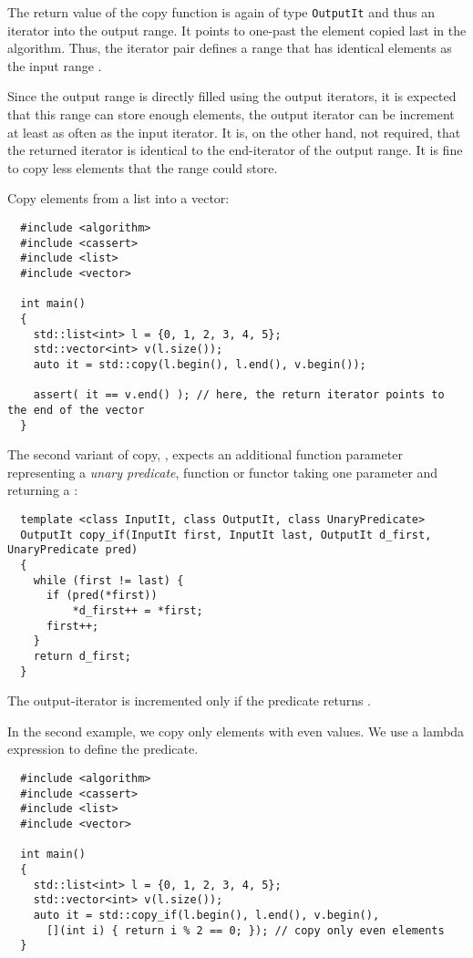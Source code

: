 The return value of the copy function is again of type \texttt{OutputIt} and thus an iterator into the output range. It points to one-past the element
copied last in the algorithm. Thus, the iterator pair \cpp{[d_first, return_value)} defines a range that has identical elements as the
input range \cpp{[first, last)}.

Since the output range is directly filled using the output iterators, it is expected that this range can store enough elements, \ie the output iterator
can be increment at least as often as the input iterator. It is, on the other hand, not required, that the returned iterator is identical to the end-iterator
of the output range. It is fine to copy less elements that the range could store.

\begin{example}
  Copy elements from a list into a vector:
  \begin{verbatim}
  #include <algorithm>
  #include <cassert>
  #include <list>
  #include <vector>

  int main()
  {
    std::list<int> l = {0, 1, 2, 3, 4, 5};
    std::vector<int> v(l.size());
    auto it = std::copy(l.begin(), l.end(), v.begin());

    assert( it == v.end() ); // here, the return iterator points to the end of the vector
  }
  \end{verbatim}
\end{example}

The second variant of copy, , expects an additional function parameter representing a \emph{unary predicate}, \ie function or functor
taking one parameter and returning a :
%
\begin{samepage}
\begin{verbatim}
  template <class InputIt, class OutputIt, class UnaryPredicate>
  OutputIt copy_if(InputIt first, InputIt last, OutputIt d_first, UnaryPredicate pred)
  {
    while (first != last) {
      if (pred(*first))
          *d_first++ = *first;
      first++;
    }
    return d_first;
  }
\end{verbatim}
\end{samepage}
%
The output-iterator is incremented only if the predicate returns .

\begin{example}
  In the second example, we copy only elements with even values. We use a lambda expression to define the predicate.
  \begin{verbatim}
  #include <algorithm>
  #include <cassert>
  #include <list>
  #include <vector>

  int main()
  {
    std::list<int> l = {0, 1, 2, 3, 4, 5};
    std::vector<int> v(l.size());
    auto it = std::copy_if(l.begin(), l.end(), v.begin(),
      [](int i) { return i % 2 == 0; }); // copy only even elements
  }
  \end{verbatim}
\end{example}


